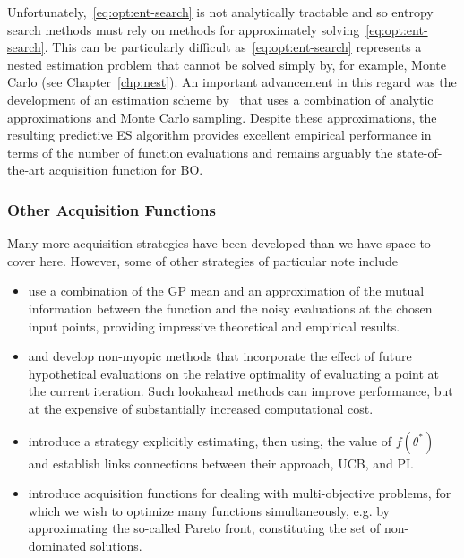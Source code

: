 Unfortunately,~\eqref{eq:opt:ent-search} is not analytically tractable and so entropy
search methods must rely on methods for approximately solving~\eqref{eq:opt:ent-search}.  
This can be particularly difficult as~\eqref{eq:opt:ent-search} represents a nested estimation
problem that cannot be solved simply by, for example, Monte Carlo (see Chapter~\ref{chp:nest}).
An important advancement in this regard was the development of an estimation scheme
by~\cite{hernandez2014predictive} that uses a combination of analytic approximations
and Monte Carlo sampling.  Despite these approximations, the resulting predictive ES algorithm
provides excellent empirical performance in terms of the number of function 
evaluations and remains arguably the state-of-the-art acquisition function for BO.

\subsubsection{Other Acquisition Functions}
\label{sec:opt:BO:acq:other}

Many more acquisition strategies have been developed than we have space 
to cover here.  However, some of other strategies of particular note include
\begin{itemize}
		\setlength\itemsep{0em}
	\item \cite{contal2014gaussian} use a combination
	of the GP mean and an approximation of the mutual information between the
	function and the noisy evaluations at the chosen input points, providing impressive
	theoretical and empirical results.
	\item \cite{osborne2009gaussian} and \cite{gonzalez2016glasses} develop
	non-myopic methods that incorporate the effect of future hypothetical evaluations on
	the relative optimality of evaluating a point at the current iteration.  Such lookahead methods
	can improve performance, but at the expensive of substantially increased computational cost.
	\item \cite{wang2016optimization} introduce a strategy explicitly estimating, then using,
	the value of $f(\theta^*)$ and establish links connections between their
	approach, UCB, and PI.
	\item \cite{swersky2013multi,shah2016pareto,hernandez2016predictive,feliot2017bayesian}
	introduce acquisition functions for dealing with multi-objective problems, for which we
	wish to optimize many functions simultaneously, e.g. by approximating
	the so-called Pareto front, constituting the set of non-dominated solutions.
\end{itemize}

